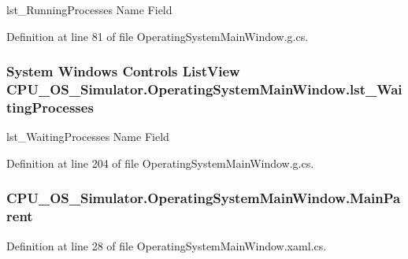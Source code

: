 lst\+\_\+\+Running\+Processes Name Field 



Definition at line 81 of file Operating\+System\+Main\+Window.\+g.\+cs.

\hypertarget{class_c_p_u___o_s___simulator_1_1_operating_system_main_window_a70185c0d33e102e203d76b79ac5c77db}{}
\subsubsection[{lst\+\_\+\+Waiting\+Processes}]{\setlength{\rightskip}{0pt plus 5cm}System Windows Controls List\+View C\+P\+U\+\_\+\+O\+S\+\_\+\+Simulator.\+Operating\+System\+Main\+Window.\+lst\+\_\+\+Waiting\+Processes}\label{class_c_p_u___o_s___simulator_1_1_operating_system_main_window_a70185c0d33e102e203d76b79ac5c77db}


lst\+\_\+\+Waiting\+Processes Name Field 



Definition at line 204 of file Operating\+System\+Main\+Window.\+g.\+cs.

\hypertarget{class_c_p_u___o_s___simulator_1_1_operating_system_main_window_ac8fb17a148ca5015223b520c35aaf854}{}
\subsubsection[{Main\+Parent}]{ C\+P\+U\+\_\+\+O\+S\+\_\+\+Simulator.\+Operating\+System\+Main\+Window.\+Main\+Parent\hspace{0.3cm}{\ttfamily [private]}}\label{class_c_p_u___o_s___simulator_1_1_operating_system_main_window_ac8fb17a148ca5015223b520c35aaf854}


Definition at line 28 of file Operating\+System\+Main\+Window.\+xaml.\+cs.

